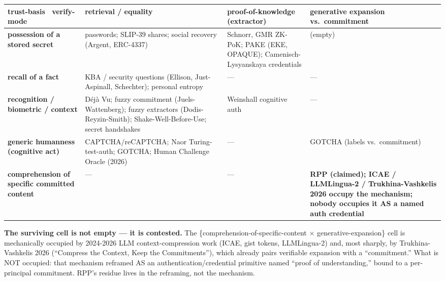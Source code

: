 \documentclass[
  11pt,
]{article}
\newcounter{none} %
\begin{document}
{\def\LTcaptype{none} %
\begin{longtable}[]{@{}
  >{\raggedright\arraybackslash}p{}
  >{\raggedright\arraybackslash}p{}
  >{\raggedright\arraybackslash}p{}
  >{\raggedright\arraybackslash}p{}@{}}
\toprule\noalign{}
\begin{minipage}[b]{\linewidth}\raggedright
trust-basis ~verify-mode
\end{minipage} & \begin{minipage}[b]{\linewidth}\raggedright
retrieval / equality
\end{minipage} & \begin{minipage}[b]{\linewidth}\raggedright
proof-of-knowledge (extractor)
\end{minipage} & \begin{minipage}[b]{\linewidth}\raggedright
generative expansion vs.~commitment
\end{minipage} \\
\midrule\noalign{}
\endhead
\bottomrule\noalign{}
\endlastfoot
\textbf{possession of a stored secret} & passwords; SLIP-39 shares;
social recovery (Argent, ERC-4337) & Schnorr, GMR ZK-PoK; PAKE (EKE,
OPAQUE); Camenisch-Lysyanskaya credentials & (empty) \\
\textbf{recall of a fact} & KBA / security questions (Ellison,
Just-Aspinall, Schechter); personal entropy & --- & --- \\
\textbf{recognition / biometric / context} & Déjà Vu; fuzzy commitment
(Juels-Wattenberg); fuzzy extractors (Dodis-Reyzin-Smith);
Shake-Well-Before-Use; secret handshakes & Weinshall cognitive auth &
--- \\
\textbf{generic humanness (cognitive act)} & CAPTCHA/reCAPTCHA; Naor
Turing-test-auth; GOTCHA; Human Challenge Oracle (2026) & --- & GOTCHA
(labels vs.~commitment) \\
\textbf{comprehension of specific committed content} & --- & --- &
\textbf{RPP (claimed); ICAE / LLMLingua-2 / Trukhina-Vashkelis 2026
occupy the mechanism; nobody occupies it AS a named auth credential} \\
\end{longtable}
}

\textbf{The surviving cell is not empty --- it is contested.} The
\{comprehension-of-specific-content × generative-expansion\} cell is
mechanically occupied by 2024-2026 LLM context-compression work (ICAE,
gist tokens, LLMLingua-2) and, most sharply, by Trukhina-Vashkelis 2026
(``Compress the Context, Keep the Commitments''), which already pairs
verifiable expansion with a ``commitment.'' What is NOT occupied: that
mechanism reframed AS an authentication/credential primitive named
``proof of understanding,'' bound to a per-principal commitment. RPP's
residue lives in the reframing, not the mechanism.
\end{document}
